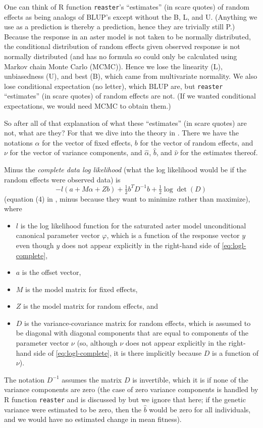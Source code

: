 \documentclass[11pt]{article}
\let\code=\texttt
\begin{document}
One can think of R function \code{reaster}'s ``estimates'' (in scare quotes)
of random effects as being analogs of BLUP's except without the B, L, and U.
(Anything we use as a prediction is thereby a prediction, hence they are
trivially still P.)
Because the response in an aster model is not taken to be normally distributed,
the conditional distribution of random effects given observed response is
not normally distributed (and has no formula so could only be calculated
using Markov chain Monte Carlo (MCMC)).  Hence we lose the linearity (L),
unbiasedness (U), and best (B), which came from multivariate normality.
We also lose conditional expectation (no letter), which BLUP are,
but \code{reaster} ``estimates'' (in scare quotes) of random effects are not.
(If we wanted conditional expectations, we would need MCMC to obtain them.)

So after all of that explanation of what these ``estimates'' (in scare quotes)
are not, what are they?  For that we dive into the theory in
\citet[Section~2]{reaster}.  There we have the notations $\alpha$ for
the vector of fixed effects, $b$ for the vector of random effects,
and $\nu$ for the vector of variance components, and
$\hat{\alpha}$, $\hat{b}$, and $\hat{\nu}$ for the estimates thereof.

Minus the \emph{complete data log likelihood} (what the log likelihood would
be if the random effects were observed data) is
\begin{equation} \label{eq:logl-complete}
   - l(a + M \alpha + Z b) + \tfrac{1}{2} b^T D^{-1} b
   + \tfrac{1}{2} \log \det(D)
\end{equation}
(equation (4) in \citet{reaster}, minus because they want to minimize
rather than maximize), where
\begin{itemize}
\item $l$ is the log likelihood function for the saturated aster model
    unconditional canonical parameter vector $\varphi$,
    which is a function of the response vector $y$ even though $y$
    does not appear explicitly in the right-hand side
    of \eqref{eq:logl-complete},
\item $a$ is the offset vector,
\item $M$ is the model matrix for fixed effects,
\item $Z$ is the model matrix for random effects, and
\item $D$ is the variance-covariance matrix for random effects,
    which is assumed to be diagonal with diagonal components that
    are equal to components of the parameter vector $\nu$ (so,
    although $\nu$ does not appear explicitly in the right-hand side
    of \eqref{eq:logl-complete}, it is there implicitly
    because $D$ is a function of $\nu$).
\end{itemize}
The notation $D^{-1}$ assumes the matrix $D$ is invertible, which it is
if none of the variance components are zero (the case of zero variance
components is handled by R function \code{reaster} and is discussed
by \citet[Section~3]{reaster} but we ignore that here; if the genetic variance
were estimated to be zero, then the $\hat{b}$ would be zero for
all individuals, and we would have no estimated change in mean fitness).
\end{document}
